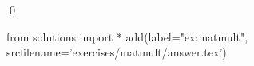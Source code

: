 
    \begin{ex}
  \label{ex:matmult}
  
  \qed
\end{ex}
\begin{python0}
from solutions import *
add(label="ex:matmult",
    srcfilename='exercises/matmult/answer.tex') 
\end{python0}                              

